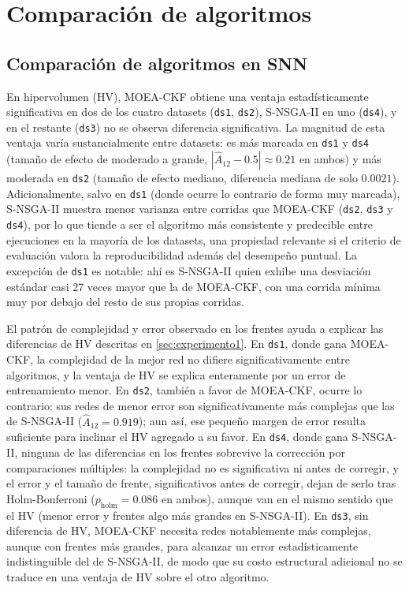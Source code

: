 \section{Comparación de algoritmos}
\subsection{Comparación de algoritmos en SNN}
\label{sec:discusion-estudio1}

En hipervolumen (HV), MOEA-CKF obtiene una ventaja estadísticamente significativa en dos de los cuatro datasets (\texttt{ds1}, \texttt{ds2}), S-NSGA-II en uno (\texttt{ds4}), y en el restante (\texttt{ds3}) no se observa diferencia significativa. La magnitud de esta ventaja varía sustancialmente entre datasets: es más marcada en \texttt{ds1} y \texttt{ds4} (tamaño de efecto de moderado a grande, $|\hat{A}_{12}-0.5|\approx0.21$ en ambos) y más moderada en \texttt{ds2} (tamaño de efecto mediano, diferencia mediana de solo $0.0021$). Adicionalmente, salvo en \texttt{ds1} (donde ocurre lo contrario de forma muy marcada), S-NSGA-II muestra menor varianza entre corridas que MOEA-CKF (\texttt{ds2}, \texttt{ds3} y \texttt{ds4}), por lo que tiende a ser el algoritmo más consistente y predecible entre ejecuciones en la mayoría de los datasets, una propiedad relevante si el criterio de evaluación valora la reproducibilidad además del desempeño puntual. La excepción de \texttt{ds1} es notable: ahí es S-NSGA-II quien exhibe una desviación estándar casi 27 veces mayor que la de MOEA-CKF, con una corrida mínima muy por debajo del resto de sus propias corridas.

El patrón de complejidad y error observado en los frentes ayuda a explicar las diferencias de HV descritas en \ref{sec:experimento1}. En \texttt{ds1}, donde gana MOEA-CKF, la complejidad de la mejor red no difiere significativamente entre algoritmos, y la ventaja de HV se explica enteramente por un error de entrenamiento menor. En \texttt{ds2}, también a favor de MOEA-CKF, ocurre lo contrario: sus redes de menor error son significativamente más complejas que las de S-NSGA-II ($\hat{A}_{12}=0.919$); aun así, ese pequeño margen de error resulta suficiente para inclinar el HV agregado a su favor. En \texttt{ds4}, donde gana S-NSGA-II, ninguna de las diferencias en los frentes sobrevive la corrección por comparaciones múltiples: la complejidad no es significativa ni antes de corregir, y el error y el tamaño de frente, significativos antes de corregir, dejan de serlo tras Holm-Bonferroni ($p_{\text{holm}}=0.086$ en ambos), aunque van en el mismo sentido que el HV (menor error y frentes algo más grandes en S-NSGA-II). En \texttt{ds3}, sin diferencia de HV, MOEA-CKF necesita redes notablemente más complejas, aunque con frentes más grandes, para alcanzar un error estadísticamente indistinguible del de S-NSGA-II, de modo que su costo estructural adicional no se traduce en una ventaja de HV sobre el otro algoritmo.

